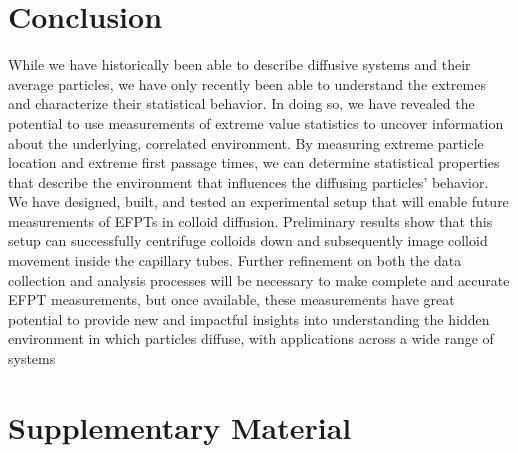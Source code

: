 \section{Conclusion}
While we have historically been able to describe diffusive systems and their average particles, we have only recently been able to understand the extremes and characterize their statistical behavior. In doing so, we have revealed the potential to use measurements of extreme value statistics to uncover information about the underlying, correlated environment. By measuring extreme particle location and extreme first passage times, we can determine statistical properties that describe the environment that influences the diffusing particles' behavior. We have designed, built, and tested an experimental setup that will enable future measurements of EFPTs in colloid diffusion. Preliminary results show that this setup can successfully centrifuge colloids down and subsequently image colloid movement inside the capillary tubes. Further refinement on both the data collection and analysis processes will be necessary to make complete and accurate EFPT measurements, but once available, these measurements have great potential to provide new and impactful insights into understanding the hidden environment in which particles diffuse, with applications across a wide range of systems~\cite{iyer-biswas_first_2015, metzler_first-passage_2014,waxman_diffusion_2017,liu_anchoring_2017,grebenkov_molecular_2021,polizzi_mean_2016,redner_guide_2001,nicholson_extracellular_1998}


\newpage
\section{Supplementary Material}
\label{ch3_supp}

